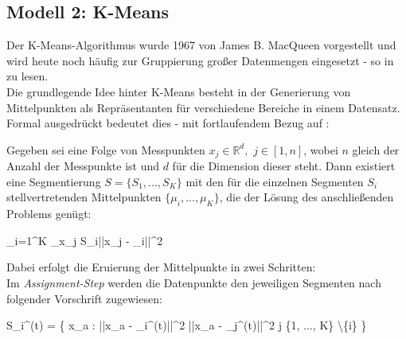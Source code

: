 	\subsection{Modell 2: K-Means}
	\label{sec:meth2}
	
		Der K-Means-Algorithmus wurde 1967 von James B. MacQueen \cite{macqueen-kmeans} vorgestellt und wird heute noch häufig zur Gruppierung großer Datenmengen eingesetzt - so in \cite{kmeans-info} zu lesen.\\
		Die grundlegende Idee hinter K-Means besteht in der Generierung von Mittelpunkten als Repräsentanten für verschiedene Bereiche in einem Datensatz. Formal ausgedrückt bedeutet dies - mit fortlaufendem Bezug auf \cite{mozdren-meth2}:
		\begin{definition}
			\label{def:kmeans1}
			Gegeben sei eine Folge von Messpunkten $x_{j} \in \mathbb{R}^{d},$ $j \in [1,n]$, wobei $n$ gleich der Anzahl der Messpunkte ist und $d$ für die Dimension dieser steht. Dann existiert eine Segmentierung $S = \{S_{1}, ..., S_{K}\}$ mit den für die einzelnen Segmenten $S_{i}$ stellvertretenden Mittelpunkten $\{\mu_{i}, ..., \mu_{K}\}$, die der Lösung des anschließenden Problems genügt:
			\begin{flalign}
				\centering
				 \sum_{i=1}^{K} \sum_{x_{j} \in S_{i}}\left|\left|x_{j} - \mu_{i}\right|\right|^{2}
			\end{flalign}
		\end{definition}
		Dabei erfolgt die Eruierung der Mittelpunkte in zwei Schritten:\\
		Im \textit{Assignment-Step} werden die Datenpunkte den jeweiligen Segmenten nach folgender Vorschrift zugewiesen:
		\begin{flalign}
			S_{i}^{(t)} = \left\{ x_{a} : \left|\left|x_{a} - \mu_{i}^{(t)}\right|\right|^{2} \leq \left|\left|x_{a} - \mu_{j^{(t)}}\right|\right|^{2} \forall j \in \{1, ..., K\} \textbackslash \{i\}  \right\}
		\end{flalign}